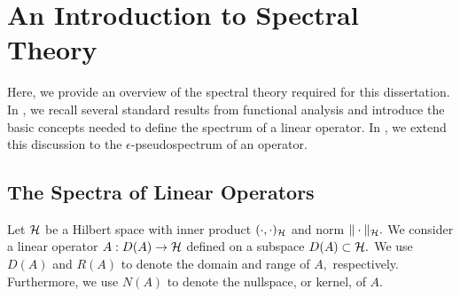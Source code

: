 
\section{An Introduction to Spectral Theory}

Here, we provide an overview of the spectral theory required for this dissertation. In , we recall several standard results from functional analysis and introduce the basic concepts needed to define the spectrum of a linear operator. In , we extend this discussion to the $\epsilon$-pseudospectrum of an operator. 


\subsection{The Spectra of Linear Operators} \label{SpecSec}





Let $\mathcal{H}$ be a Hilbert space with inner product $(\cdot, \cdot)_{\mathcal{H}}$ and norm $\|\cdot \|_{\mathcal{H}}.$
We consider a linear operator $A : D(A) \rightarrow \mathcal{H}$ defined on a subspace $D(A) \subset \mathcal{H}.$ We use $D(A)$ and $R(A)$ to denote the domain and range of $A,$ respectively. Furthermore, we use $N(A)$ to denote the nullspace, or kernel, of $A.$

